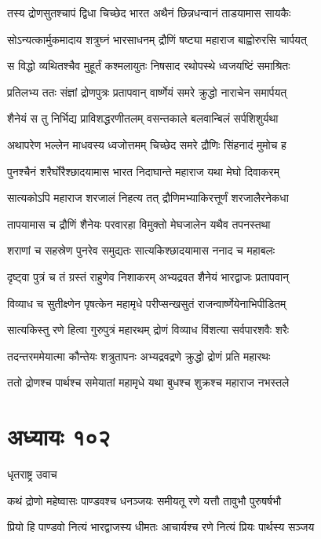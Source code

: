 \twolineshloka
{तस्य द्रोणसुतश्चापं द्विधा चिच्छेद भारत}
{अथैनं छिन्नधन्वानं ताडयामास सायकैः}


\twolineshloka
{सोऽन्यत्कार्मुकमादाय शत्रुघ्नं भारसाधनम्}
{द्रौणिं षष्ट्या महाराज बाह्वोरुरसि चार्पयत्}


\twolineshloka
{स विद्धो व्यथितश्चैव मुहूर्तं कश्मलायुतः}
{निषसाद रथोपस्थे ध्वजयष्टिं समाश्रितः}


\twolineshloka
{प्रतिलभ्य ततः संज्ञां द्रोणपुत्रः प्रतापवान्}
{वार्ष्णेयं समरे क्रुद्धो नाराचेन समार्पयत्}


\twolineshloka
{शैनेयं स तु निर्भिद्य प्राविशद्धरणीतलम्}
{वसन्तकाले बलवान्बिलं सर्पशिशुर्यथा}


\twolineshloka
{अथापरेण भल्लेन माधवस्य ध्वजोत्तमम्}
{चिच्छेद समरे द्रौणिः सिंहनादं मुमोच ह}


\twolineshloka
{पुनश्चैनं शरैर्घोरैश्छादयामास भारत}
{निदाघान्ते महाराज यथा मेघो दिवाकरम्}


\twolineshloka
{सात्यकोऽपि महाराज शरजालं निहत्य तत्}
{द्रौणिमभ्याकिरत्तूर्णं शरजालैरनेकधा}


\twolineshloka
{तापयामास च द्रौणिं शैनेयः परवारहा}
{विमुक्तो मेघजालेन यथैव तपनस्तथा}


\twolineshloka
{शराणां च सहस्रेण पुनरेव समुद्यतः}
{सात्यकिश्छादयामास ननाद च महाबलः}


\twolineshloka
{दृष्ट्वा पुत्रं च तं ग्रस्तं राहुणेव निशाकरम्}
{अभ्यद्रवत शैनेयं भारद्वाजः प्रतापवान्}


\twolineshloka
{विव्याध च सुतीक्ष्णेन पृषत्केन महामृधे}
{परीप्सन्खसुतं राजन्वार्ष्णेयेनाभिपीडितम्}


\twolineshloka
{सात्यकिस्तु रणे हित्वा गुरुपुत्रं महारथम्}
{द्रोणं विव्याध विंशत्या सर्वपारशवैः शरैः}


\twolineshloka
{तदन्तरममेयात्मा कौन्तेयः शत्रुतापनः}
{अभ्यद्रवद्रणे क्रुद्धो द्रोणं प्रति महारथः}


\twolineshloka
{ततो द्रोणश्च पार्थश्च समेयातां महामृधे}
{यथा बुधश्च शुक्रश्च महाराज नभस्तले}


\chapter{अध्यायः १०२}
\twolineshloka
{धृतराष्ट्र उवाच}
{}


\twolineshloka
{कथं द्रोणो महेष्वासः पाण्डवश्च धनञ्जयः}
{समीयतू रणे यत्तौ तावुभौ पुरुषर्षभौ}


\twolineshloka
{प्रियो हि पाण्डवो नित्यं भारद्वाजस्य धीमतः}
{आचार्यश्च रणे नित्यं प्रियः पार्थस्य सञ्जय}


